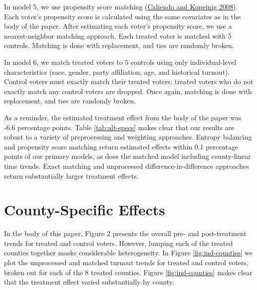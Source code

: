 \documentclass[
  12pt,
]{article}
\begin{document}
In model 5, we use propensity score matching (\protect\hyperlink{ref-Caliendo2008}{Caliendo and Kopeinig 2008}). Each voter's propensity score is calculated using the same covariates as in the body of the paper. After estimating each voter's propensity score, we use a nearest-neighbor matching approach. Each treated voter is matched with 5 controls. Matching is done with replacement, and ties are randomly broken.

In model 6, we match treated voters to 5 controls using only individual-level characteristics (race, gender, party affiliation, age, and historical turnout). Control voters must exactly match their treated voters; treated voters who do not exactly match any control voters are dropped. Once again, matching is done with replacement, and ties are randomly broken.

As a reminder, the estimated treatment effect from the body of the paper was -6.6 percentage points. Table \ref{tab:alt-specs} makes clear that our results are robust to a variety of preprocessing and weighting approaches. Entropy balancing and propensity score matching return estimated effects within 0.1 percentage points of our primary models, as does the matched model including county-linear time trends. Exact matching and unprocessed difference-in-difference approaches return substantially larger treatment effects.

\begin{singlespace}

\end{singlespace}

\hypertarget{county-specific-effects}{%
\section*{County-Specific Effects}\label{county-specific-effects}}

In the body of this paper, Figure 2 presents the overall pre- and post-treatment trends for treated and control voters. However, lumping each of the treated counties together masks considerable heterogeneity. In Figure \ref{fig:ind-counties} we plot the unprocessed and matched turnout trends for treated and control voters, broken out for each of the 8 treated counties. Figure \ref{fig:ind-counties} makes clear that the treatment effect varied substantially by county.
\end{document}
